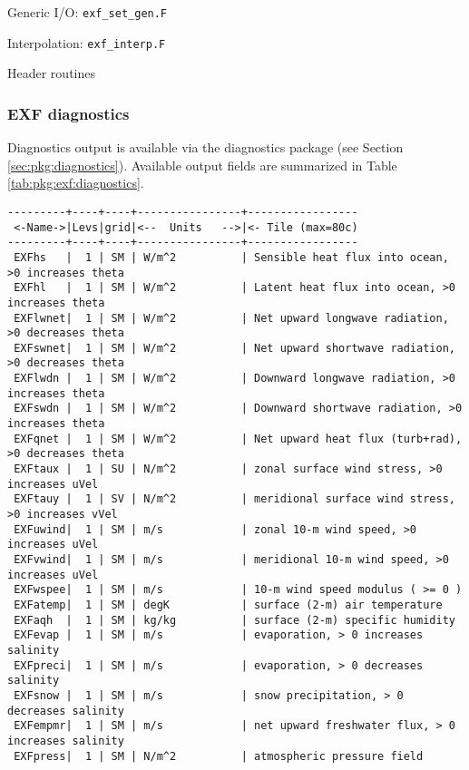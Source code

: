 Generic I/O: \texttt{exf\_set\_gen.F}

Interpolation: \texttt{exf\_interp.F}

Header routines


\subsubsection{EXF diagnostics
\label{sec:pkg:exf:diagnostics}}

Diagnostics output is available via the diagnostics package
(see Section \ref{sec:pkg:diagnostics}).
Available output fields are summarized in 
Table \ref{tab:pkg:exf:diagnostics}.

\begin{table}[!ht]
\centering
{\footnotesize
\begin{verbatim}
---------+----+----+----------------+-----------------
 <-Name->|Levs|grid|<--  Units   -->|<- Tile (max=80c)
---------+----+----+----------------+-----------------
 EXFhs   |  1 | SM | W/m^2          | Sensible heat flux into ocean, >0 increases theta
 EXFhl   |  1 | SM | W/m^2          | Latent heat flux into ocean, >0 increases theta
 EXFlwnet|  1 | SM | W/m^2          | Net upward longwave radiation, >0 decreases theta
 EXFswnet|  1 | SM | W/m^2          | Net upward shortwave radiation, >0 decreases theta
 EXFlwdn |  1 | SM | W/m^2          | Downward longwave radiation, >0 increases theta
 EXFswdn |  1 | SM | W/m^2          | Downward shortwave radiation, >0 increases theta
 EXFqnet |  1 | SM | W/m^2          | Net upward heat flux (turb+rad), >0 decreases theta
 EXFtaux |  1 | SU | N/m^2          | zonal surface wind stress, >0 increases uVel
 EXFtauy |  1 | SV | N/m^2          | meridional surface wind stress, >0 increases vVel
 EXFuwind|  1 | SM | m/s            | zonal 10-m wind speed, >0 increases uVel
 EXFvwind|  1 | SM | m/s            | meridional 10-m wind speed, >0 increases uVel
 EXFwspee|  1 | SM | m/s            | 10-m wind speed modulus ( >= 0 )
 EXFatemp|  1 | SM | degK           | surface (2-m) air temperature
 EXFaqh  |  1 | SM | kg/kg          | surface (2-m) specific humidity
 EXFevap |  1 | SM | m/s            | evaporation, > 0 increases salinity
 EXFpreci|  1 | SM | m/s            | evaporation, > 0 decreases salinity
 EXFsnow |  1 | SM | m/s            | snow precipitation, > 0 decreases salinity
 EXFempmr|  1 | SM | m/s            | net upward freshwater flux, > 0 increases salinity
 EXFpress|  1 | SM | N/m^2          | atmospheric pressure field
\end{verbatim}
}
\caption{~}
\label{tab:pkg:exf:diagnostics}
\end{table}

